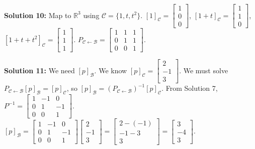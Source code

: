 \documentclass[11pt]{article}
\begin{document}
\vspace{0.5cm}
\textbf{Solution 10:} Map to $\mathbb{R}^3$ using $\mathcal{C} = \{1, t, t^2\}$.
$[1]_{\mathcal{C}} = \begin{bmatrix} 1 \\ 0 \\ 0 \end{bmatrix}$, $[1+t]_{\mathcal{C}} = \begin{bmatrix} 1 \\ 1 \\ 0 \end{bmatrix}$, $[1+t+t^2]_{\mathcal{C}} = \begin{bmatrix} 1 \\ 1 \\ 1 \end{bmatrix}$.
$P_{\mathcal{C} \leftarrow \mathcal{B}} = \begin{bmatrix} 1 & 1 & 1 \\ 0 & 1 & 1 \\ 0 & 0 & 1 \end{bmatrix}$.

\vspace{0.5cm}
\textbf{Solution 11:} We need $[p]_{\mathcal{B}}$. We know $[p]_{\mathcal{C}} = \begin{bmatrix} 2 \\ -1 \\ 3 \end{bmatrix}$.
We must solve $P_{\mathcal{C} \leftarrow \mathcal{B}}[p]_{\mathcal{B}} = [p]_{\mathcal{C}}$, so $[p]_{\mathcal{B}} = (P_{\mathcal{C} \leftarrow \mathcal{B}})^{-1}[p]_{\mathcal{C}}$.
From Solution 7, $P^{-1} = \begin{bmatrix} 1 & -1 & 0 \\ 0 & 1 & -1 \\ 0 & 0 & 1 \end{bmatrix}$.
$[p]_{\mathcal{B}} = \begin{bmatrix} 1 & -1 & 0 \\ 0 & 1 & -1 \\ 0 & 0 & 1 \end{bmatrix} \begin{bmatrix} 2 \\ -1 \\ 3 \end{bmatrix} = \begin{bmatrix} 2 - (-1) \\ -1 - 3 \\ 3 \end{bmatrix} = \begin{bmatrix} 3 \\ -4 \\ 3 \end{bmatrix}$.
\end{document}
